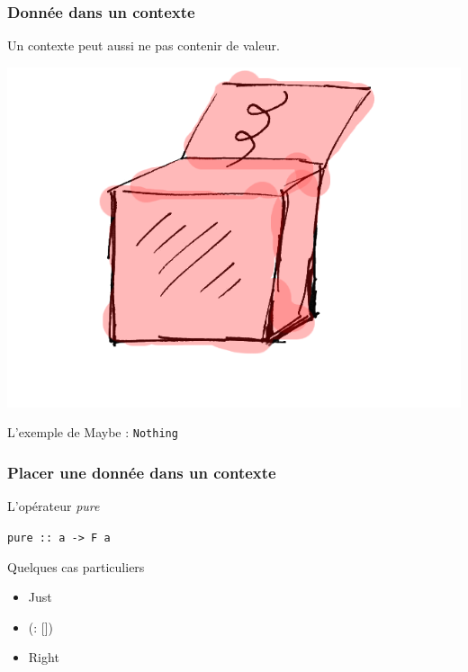 \documentclass{beamer}
\begin{document}
\begin{frame}
\frametitle{Donnée dans un contexte}

\begin{block}{}
Un contexte peut aussi ne pas contenir de valeur.
\end{block}

\begin{center}
\includegraphics[scale=0.3]{nothing.png}
\end{center}
\begin{exampleblock}{}
L'exemple de Maybe : \verb!Nothing!
\end{exampleblock}
\end{frame}

\begin{frame}
\frametitle{Placer une donnée dans un contexte}

\begin{block}{L'opérateur \emph{pure}}
\begin{center}
\verb!pure :: a -> F a!
\end{center}
\end{block}

\begin{exampleblock}{Quelques cas particuliers}
	\begin{itemize}
		\item Just
		\item (: [])
		\item Right
	\end{itemize}
\end{exampleblock}
\end{frame}
\end{document}
